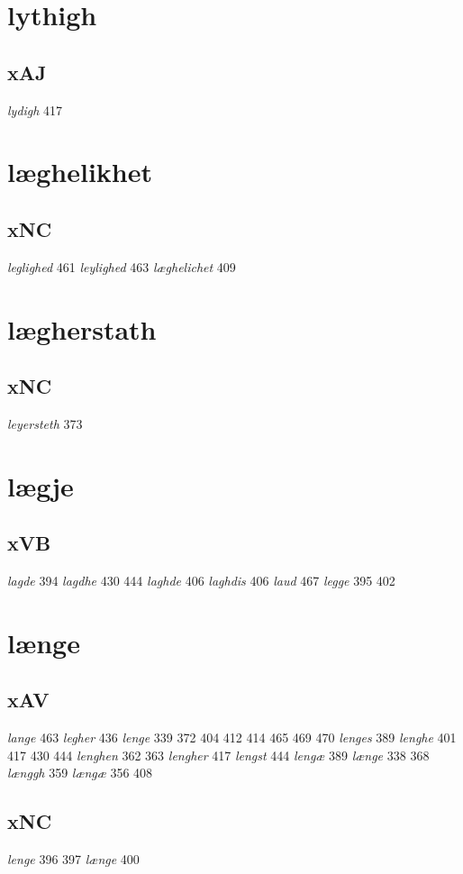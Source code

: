 \documentclass[a4paper,twocolumn]{article}
\begin{document}
\section{lythigh}
\label{sec:org52f0413}
\subsection{xAJ}
\label{sec:orgc7d0fec}
\emph{lydigh} 417 
\section{læghelikhet}
\label{sec:org285427e}
\subsection{xNC}
\label{sec:org23a1e5b}
\emph{leglighed} 461 \emph{leylighed} 463 \emph{læghelichet} 409 
\section{lægherstath}
\label{sec:org3147142}
\subsection{xNC}
\label{sec:orge628d9a}
\emph{leyersteth} 373 
\section{lægje}
\label{sec:org4f99134}
\subsection{xVB}
\label{sec:orgbd8c5ca}
\emph{lagde} 394 \emph{lagdhe} 430 444 \emph{laghde} 406 \emph{laghdis} 406 \emph{laud} 467 \emph{legge} 395 402 
\section{længe}
\label{sec:orgbf9d23a}
\subsection{xAV}
\label{sec:org7394645}
\emph{lange} 463 \emph{legher} 436 \emph{lenge} 339 372 404 412 414 465 469 470 \emph{lenges} 389 \emph{lenghe} 401 417 430 444 \emph{lenghen} 362 363 \emph{lengher} 417 \emph{lengst} 444 \emph{lengæ} 389 \emph{længe} 338 368 \emph{længgh} 359 \emph{længæ} 356 408 
\subsection{xNC}
\label{sec:org3adb7c3}
\emph{lenge} 396 397 \emph{længe} 400 
\end{document}

